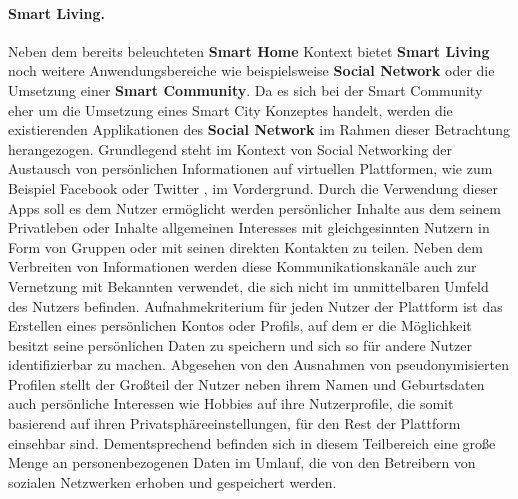 \paragraph{Smart Living.}
\label{sec:Analyse der Datenerhebung:ssec:Smart City:para:Smart Living}
Neben dem bereits beleuchteten \textbf{Smart Home} Kontext bietet \textbf{Smart Living} noch weitere Anwendungsbereiche wie beispielsweise \textbf{Social Network} oder die Umsetzung einer \textbf{Smart Community}. Da es sich bei der Smart Community eher um die Umsetzung eines Smart City Konzeptes handelt, werden die existierenden Applikationen des \textbf{Social Network} im Rahmen dieser Betrachtung herangezogen. Grundlegend steht im Kontext von Social Networking der Austausch von persönlichen Informationen auf virtuellen Plattformen, wie zum Beispiel Facebook \cite{Facebook2022} oder Twitter \cite{Twitter2022}, im Vordergrund. Durch die Verwendung dieser Apps soll es dem Nutzer ermöglicht werden persönlicher Inhalte aus dem seinem Privatleben oder Inhalte allgemeinen Interesses mit gleichgesinnten Nutzern in Form von Gruppen oder mit seinen direkten Kontakten zu teilen. Neben dem Verbreiten von Informationen werden diese Kommunikationskanäle auch zur Vernetzung mit Bekannten verwendet, die sich nicht im unmittelbaren Umfeld des Nutzers befinden. Aufnahmekriterium für jeden Nutzer der Plattform ist das Erstellen eines persönlichen Kontos oder Profils, auf dem er die Möglichkeit besitzt seine persönlichen Daten zu speichern und sich so für andere Nutzer identifizierbar zu machen. Abgesehen von den Ausnahmen von pseudonymisierten Profilen stellt der Großteil der Nutzer neben ihrem Namen und Geburtsdaten auch persönliche Interessen wie Hobbies auf ihre Nutzerprofile, die somit basierend auf ihren Privatsphäreeinstellungen, für den Rest der Plattform einsehbar sind. Dementsprechend befinden sich in diesem Teilbereich eine große Menge an personenbezogenen Daten im Umlauf, die von den Betreibern von sozialen Netzwerken erhoben und gespeichert werden.\\

